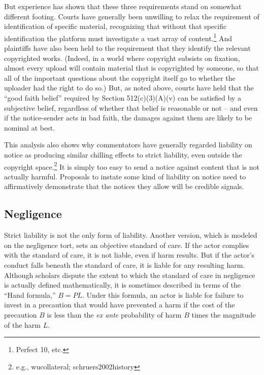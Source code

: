 But experience has shown that these three requirements stand on somewhat different footing. Courts have generally been unwilling to relax the requirement of identification of specific material, recognizing that without that specific identification the platform must investigate a vast array of content.\footnote{Perfect 10, etc.} And plaintiffs have also been held to the requirement that they identify the relevant copyrighted works. (Indeed, in a world where copyright subsists on fixation, almost every upload will contain material that is copyrighted by someone, so that all of the important questions about the copyright itself go to whether the uploader had the right to do so.) But, as noted above, courts have held that the ``good faith belief'' required by Section 512(c)(3)(A)(v) can be satisfied by a subjective belief, regardless of whether that belief is reasonable or not -- and even if the notice-sender acts in bad faith, the damages against them are likely to be nominal at best. 

This analysis also shows why commentators have generally regarded liability on notice as producing similar chilling effects to strict liability, even outside the copyright space.\footnote{e.g., wucollateral; schruers2002history} It is simply too easy to send a notice against content that is not actually harmful. Proposals to instate some kind of liability on notice need to affirmatively demonstrate that the notices they allow will be credible signals.



\subsection{Negligence}
\label{sec:negligence}

Strict liability is not the only form of liability. Another version, which is modeled on the negligence tort, sets an objective standard of care. If the actor complies with the standard of care, it is not liable, even if harm results. But if the actor's conduct falls beneath the standard of care, it is liable for any resulting harm. Although scholars dispute the extent to which the standard of care in negligence is actually defined mathematically, it is sometimes described in terms of the ``Hand formula,'' $B = PL$. Under this formula, an actor is liable for failure to invest in a precaution that would have prevented a harm if the cost of the precaution $B$ is less than the \emph{ex ante} probability of harm $B$ times the magnitude of the harm $L$.


